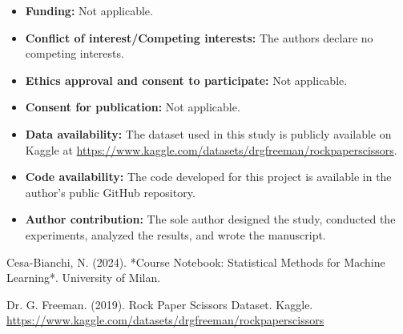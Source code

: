 \documentclass[pdflatex,sn-mathphys-num]{sn-jnl}%
\theoremstyle{thmstyleone}%
\theoremstyle{thmstyletwo}%
\theoremstyle{thmstylethree}%
\begin{document}
\begin{itemize}
\item \textbf{Funding:} Not applicable.
\item \textbf{Conflict of interest/Competing interests:} The authors declare no competing interests.
\item \textbf{Ethics approval and consent to participate:} Not applicable.
\item \textbf{Consent for publication:} Not applicable.
\item \textbf{Data availability:} The dataset used in this study is publicly available on Kaggle at \url{https://www.kaggle.com/datasets/drgfreeman/rockpaperscissors}.
\item \textbf{Code availability:} The code developed for this project is available in the author's public GitHub repository.
\item \textbf{Author contribution:} The sole author designed the study, conducted the experiments, analyzed the results, and wrote the manuscript.
\end{itemize}

\begin{thebibliography}{9}

Cesa-Bianchi, N. (2024). *Course Notebook: Statistical Methods for Machine Learning*. University of Milan.

Dr. G. Freeman. (2019). Rock Paper Scissors Dataset. Kaggle. \url{https://www.kaggle.com/datasets/drgfreeman/rockpaperscissors}

\end{thebibliography}
\end{document}
